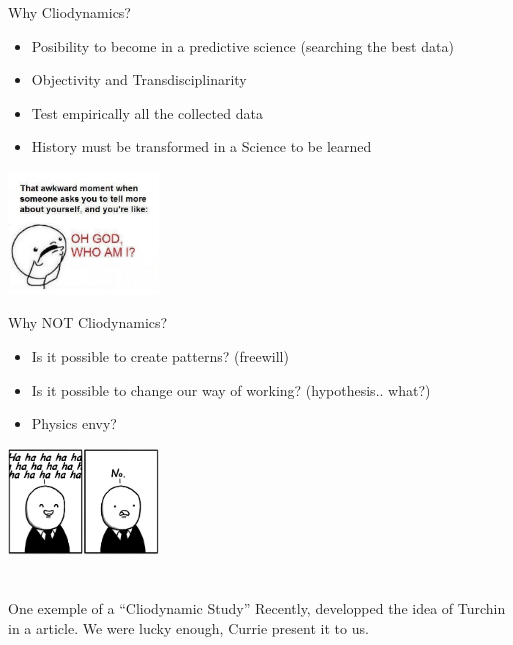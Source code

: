 \documentclass{beamer}
\begin{document}
    \begin{frame}{Why Cliodynamics?}

	\begin{itemize}
	    \item  Posibility to become in a predictive science (searching the best data)
		   \item  Objectivity and Transdisciplinarity
		   \item  Test empirically all the collected data
		   \item  History must be transformed in a Science to be learned
	\end{itemize}
	\begin{center}
	    \includegraphics[width=4cm]{images/3.jpg}
	\end{center}
    \end{frame}
    \begin{frame}{	Why NOT Cliodynamics? }

	\begin{itemize}
	    \item  Is it possible to create patterns? (freewill)
	    \item  Is it possible to change our way of working? (hypothesis.. what?)
	    \item  Physics envy?
	\end{itemize}

	\begin{center}
	    \includegraphics[width=4cm]{images/5}
	\end{center}

    \end{frame}
\section{\cite{turchin_war_2013}}
\begin{frame}{One exemple of a ``Cliodynamic Study''}
    Recently, \cite{turchin_war_2013} developped the idea of Turchin in a article.
    We were lucky enough, Currie present it to us.
\end{frame}
\end{document}
